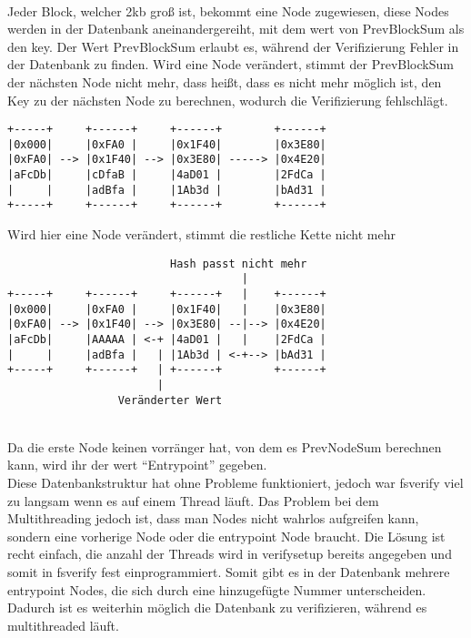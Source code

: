 \\
Jeder Block, welcher 2kb groß ist, bekommt eine Node zugewiesen, diese Nodes werden in der Datenbank aneinandergereiht, mit dem wert von PrevBlockSum als den key.
Der Wert PrevBlockSum erlaubt es, während der Verifizierung Fehler in der Datenbank zu finden. Wird eine Node verändert, stimmt der PrevBlockSum der nächsten Node nicht mehr, dass heißt, dass es nicht mehr möglich ist, den Key zu der nächsten Node zu berechnen, wodurch die Verifizierung fehlschlägt.
\begin{verbatim}
+-----+     +------+     +------+        +------+
|0x000|     |0xFA0 |     |0x1F40|        |0x3E80|
|0xFA0| --> |0x1F40| --> |0x3E80| -----> |0x4E20|
|aFcDb|     |cDfaB |     |4aD01 |        |2FdCa |
|     |     |adBfa |     |1Ab3d |        |bAd31 |
+-----+     +------+     +------+        +------+
\end{verbatim}
\pagebreak
Wird hier eine Node verändert, stimmt die restliche Kette nicht mehr
\begin{verbatim}
                         Hash passt nicht mehr
                                    |
+-----+     +------+     +------+   |    +------+
|0x000|     |0xFA0 |     |0x1F40|   |    |0x3E80|
|0xFA0| --> |0x1F40| --> |0x3E80| --|--> |0x4E20|
|aFcDb|     |AAAAA | <-+ |4aD01 |   |    |2FdCa |
|     |     |adBfa |   | |1Ab3d | <-+--> |bAd31 |
+-----+     +------+   | +------+        +------+
                       |
                 Veränderter Wert
\end{verbatim}
\\
Da die erste Node keinen vorränger hat, von dem es PrevNodeSum berechnen kann, wird ihr der wert ``Entrypoint'' gegeben.
\\
Diese Datenbankstruktur hat ohne Probleme funktioniert, jedoch war fsverify viel zu langsam wenn es auf einem Thread läuft. Das Problem bei dem Multithreading jedoch ist, dass man Nodes nicht wahrlos aufgreifen kann, sondern eine vorherige Node oder die entrypoint Node braucht. Die Lösung ist recht einfach, die anzahl der Threads wird in verifysetup bereits angegeben und somit in fsverify fest einprogrammiert. Somit gibt es in der Datenbank mehrere entrypoint Nodes, die sich durch eine hinzugefügte Nummer unterscheiden. Dadurch ist es weiterhin möglich die Datenbank zu verifizieren, während es multithreaded läuft.

